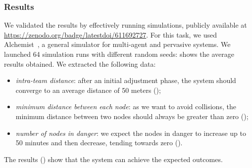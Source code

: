 \subsubsection{Results}
We validated the results by effectively running simulations, 
 publicly available at \url{https://zenodo.org/badge/latestdoi/611692727}. 
 For this task, we used Alchemist~\cite{DBLP:journals/jos/PianiniMV13}, a general simulator for multi-agent and pervasive systems. %
%
We launched 64 simulation runs with different random seeds: 
  shows the average results obtained. 
We extracted the following data:
\begin{itemize}
  \item \emph{intra-team distance}:
   after an initial adjustment phase, 
   the system should converge to an average distance of 50 meters ();
  \item \emph{minimum distance between each node}: 
    as we want to avoid collisions, 
    the minimum distance between 
    two nodes should always be greater than zero ();
  \item \emph{number of nodes in danger}: 
   we expect the nodes in danger to increase 
   up to 50 minutes and then decrease, tending towards zero ().
\end{itemize}
The results () show that the system can achieve the expected outcomes.
